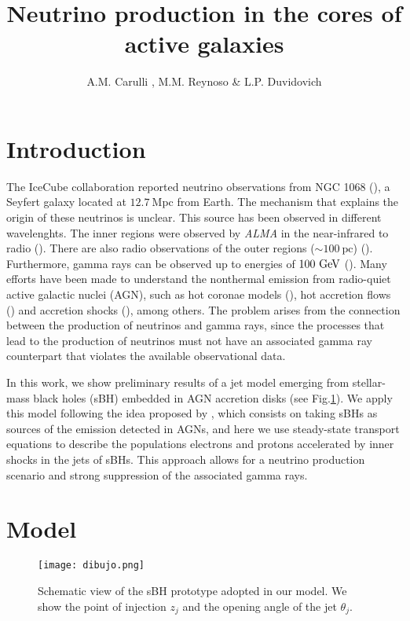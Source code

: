 \documentclass[baaa]{baaa}
\title{Neutrino production in the cores of active galaxies}
\author{A.M. Carulli \inst{1,2}, M.M. Reynoso \inst{1,2} \& L.P. Duvidovich \inst{1,2}
}
\institute{
Instituto de Investigaciones F{\'\i}sicas de Mar del Plata, CONICET--UNMdP, Argentina
\and
Departamento de F{\'\i}sica, Facultad de Ciencias Exactas y Naturales, UNMdP, Argentina
}
\begin{document}
\maketitle
\section{Introduction}\label{S_intro}
The IceCube collaboration reported neutrino observations from NGC 1068 (\citealt{Aartsen2020}), a Seyfert galaxy located at $12.7 ~$Mpc from Earth. The mechanism that explains the origin of these neutrinos is unclear. This source has been observed in different wavelenghts. The inner regions were observed by {\sl ALMA} in the near-infrared to radio (\citealt{GarciaBurillo2019}). There are also radio observations of the outer regions ($\sim 100 ~ \mathrm{pc}$) (\citealt{Sajina2011}). Furthermore, gamma rays can be observed up to energies of $100 ~\rm{GeV}$ (\citealt{Ajello2017,Acciari2019,Abdollahi2020}). Many efforts have been made to understand the nonthermal emission from radio-quiet active galactic nuclei (AGN), such as hot coronae models (\citealt{Murase2020,Eichmann2022}), hot accretion flows (\citealt{Gutierrez2021}) and accretion shocks (\citealt{Inoue2020}), among others. The problem arises from the connection between the production of neutrinos and gamma rays, since the processes that lead to the production of neutrinos must not have an associated gamma ray counterpart that violates the available observational data.

In this work, we show preliminary results of a jet model emerging from stellar-mass black holes (sBH) embedded in AGN accretion disks (see Fig.\ref{fig:Figura}). We apply this model following the idea proposed by \cite{Tagawa2023}, which consists on taking sBHs as sources of the emission detected in AGNs, and here we use steady-state transport equations to describe the populations electrons and protons accelerated by inner shocks in the jets of sBHs. This approach allows for a neutrino production scenario and strong suppression of the associated gamma rays.


\section{Model}\label{S_model}

\begin{figure}[!t]
\centering
\texttt{[image: dibujo.png]}
\caption{Schematic view of the sBH prototype adopted in our model. We show the point of injection $z_j$ and the opening angle of the jet $\theta_j$.}
\label{fig:Figura}
\end{figure}
\end{document}
